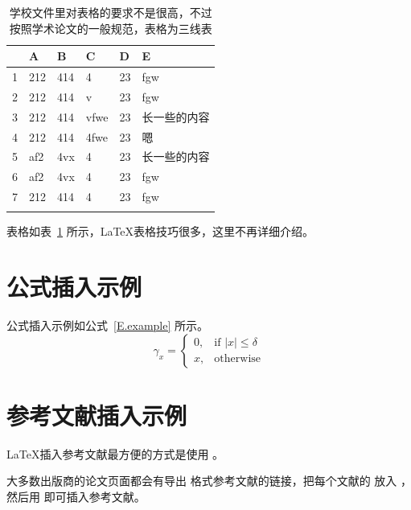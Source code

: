 \begin{table}[htb]
  \centering
  \caption{学校文件里对表格的要求不是很高，不过按照学术论文的一般规范，表格为三线表}
  \label{T.example}
  \begin{tabular}{llllll}
  \hline
   & A  & B  & C  & D  & E \\
  \hline
1 	& 212 & 414 & 4 		& 23 & fgw	\\
2 	& 212 & 414 & v 		& 23 & fgw	\\
3 	& 212 & 414 & vfwe		& 23 & 长一些的内容	\\
4 	& 212 & 414 & 4fwe		& 23 & 嗯	\\
5 	& af2 & 4vx & 4 		& 23 & 长一些的内容	\\
6 	& af2 & 4vx & 4 		& 23 & fgw	\\
7 	& 212 & 414 & 4 		& 23 & fgw	\\

\hline{}
\end{tabular}
\end{table}

表格如表~\ref{T.example} 所示，\LaTeX 表格技巧很多，这里不再详细介绍。

\lipsum

\newpage    %

\section{公式插入示例}

\lipsum

公式插入示例如公式~\eqref{E.example} 所示。
\begin{equation}
\gamma_x=
\begin{cases}
  0, & \text{if $|x| \leq \delta$} \\
  x, & \text{otherwise}
\end{cases}
\label{E.example}
\end{equation}


\newpage    %

\section{参考文献插入示例}

\LaTeX \cite{lamport1994latex}插入参考文献最方便的方式是使用 \cite{pritchard1969statistical}。

大多数出版商的论文页面都会有导出  格式参考文献的链接，把每个文献的  放入 ，然后用  即可插入参考文献。

